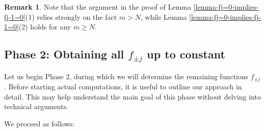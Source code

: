 \documentclass[12pt, pdflatex, a4paper]{article}
\theoremstyle{plain}
\theoremstyle{definition}
\newtheorem{rem}[thm]{Remark}
\begin{document}
\begin{rem} Note that the argument in the proof of Lemma \ref{lemma-fj=0-implies-fj-1=0}(1) relies strongly on the fact $m > N$, while Lemma \ref{lemma-fj=0-implies-fj-1=0}(2) holds for any $m \geq N$.
\end{rem}

\subsection{Phase 2: Obtaining all $f_{\pm j}$ up to constant}\label{section-phase2}

Let us begin Phase 2, during which we will determine the remaining functions $f_{\pm j}$. Before starting actual computations, it is useful to outline our approach in detail. This may help understand the main goal of this phase without delving into technical arguments.

We proceed as follows:
\end{document}
